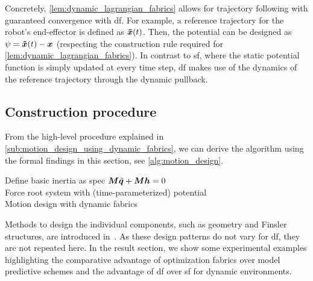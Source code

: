 Concretely, \cref{lem:dynamic_lagrangian_fabrics} allows for trajectory following
with guaranteed convergence with \ac{df}. For example, a reference trajectory 
for the robot's end-effector is defined as $\bm{\tilde{x}}(t)$. Then, the potential can be designed
as $\psi = \bm{\tilde{x}}(t) - \bm{x}$ (respecting the construction rule required
for \cref{lem:dynamic_lagrangian_fabrics}). In contrast to \ac{sf}, where the static
potential function is simply updated at every time step, \ac{df} makes use of the dynamics 
of the reference trajectory through the dynamic pullback.

\subsection{Construction procedure}

From the high-level procedure explained in \cref{sub:motion_design_using_dynamic_fabrics}, we can
derive the algorithm using the formal findings in this section, see \cref{alg:motion_design}.
\begin{algorithm}
  Define basic inertia as spec $\bm{M}\ddot{\bm{q}} + \bm{M}\bm{h} = 0$ \\
  Force root system with (time\hyp{}parameterized) potential\\
  \caption{Motion design with dynamic fabrics}
  \label{alg:motion_design}
\end{algorithm}

Methods to design the individual components, such as geometry and 
Finsler structures, are introduced in~\cite{Ratliff2020}.
As these design patterns do not vary for \ac{df}, they are not repeated here.
In the result section, we show some experimental examples highlighting
the comparative advantage of
optimization fabrics over model predictive schemes and the advantage of \ac{df}
over \ac{sf} for dynamic environments.


